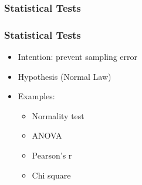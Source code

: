 \subsubsection{Statistical Tests}

\begin{frame}\frametitle{Statistical Tests}
   \begin{itemize}
      \item Intention: prevent sampling error
      \item Hypothesis (Normal Law)
      \item Examples:
      \begin{itemize}
         \item Normality test
         \item ANOVA
         \item Pearson's r
         \item Chi square
      \end{itemize}
   \end{itemize}
\end{frame}



